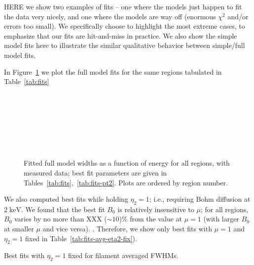 \documentclass[iop, apj, numberedappendix, twocolappendix]{emulateapj}
\newcommand*{\mt}{\mathrm}
\newcommand*{\unit}[1]{\;\mt{#1}}  %
\newcommand*{\abt}{\mathord{\sim}} %
\begin{document}
HERE we show two examples of fits -- one where the models just happen to fit
the data very nicely, and one where the models are way off (enormous $\chi^2$
and/or errors too small).  We specifically choose to highlight the most extreme
cases, to emphasize that our fits are hit-and-miss in practice.
We also show the simple model fits here to illustrate the similar qualitative
behavior between simple/full model fits.



In Figure~\ref{fig:fits-all} we plot the full model fits for the same regions
tabulated in Table~\ref{tab:fits}

\begin{figure}[ht]
    \centering
     \\
     \\
     \\
     \\
     \\
     \\
    \caption{Fitted full model widths as a function of energy for all regions,
    with measured data; best fit parameters are given in
    Tables~\ref{tab:fits},~\ref{tab:fits-pt2}.  Plots are ordered by region
    number.}
    \label{fig:fits-all}
\end{figure}

We also computed best fits while holding $\eta_2 = 1$; i.e., requiring Bohm
diffusion at $2 \unit{keV}$.  We found that the best fit $B_0$ is relatively
insensitive to $\mu$; for all regions, $B_0$ varies by no more than XXX ($\abt 10$)\% from
the value at $\mu = 1$ (with larger $B_0$ at smaller $\mu$ and vice versa).
.
Therefore, we show only best fits with $\mu = 1$ and $\eta_2 = 1$ fixed in
Table~\ref{tab:fits-avg-eta2-fix}).

\begin{table*}
    \scriptsize
    \centering
    \caption{Best fits with $\eta_2 = 1$ fixed for filament averaged FWHMs.
    \label{tab:fits-avg-eta2-fix}}
    
\end{table*}
\end{document}
